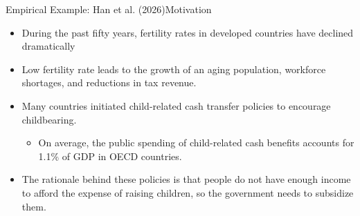 \documentclass[dvipsnames,hyperref={pdfpagelabels=false}]{beamer}
\begin{document}
\begin{frame}{Empirical Example: Han et al. (2026)}{Motivation}
	\begin{itemize} 
		
			\item During the past fifty years, fertility rates in developed countries have declined dramatically
		\vspace{0.3cm}
		\item Low fertility rate leads to the growth of an aging population, workforce shortages, and reductions in tax revenue.
		\vspace{0.3cm}
		\item Many countries initiated child-related cash transfer policies to encourage childbearing.
		\vspace{0.3cm}
		\begin{itemize}
			\item On average, the public spending of child-related cash benefits accounts for 1.1\% of GDP in OECD countries.
			\vspace{0.3cm}
		\end{itemize}
		\item The rationale behind these policies is that people do not have enough income to afford the expense of raising children, so the government needs to subsidize them.
		
	\end{itemize}	
\end{frame}
\end{document}
